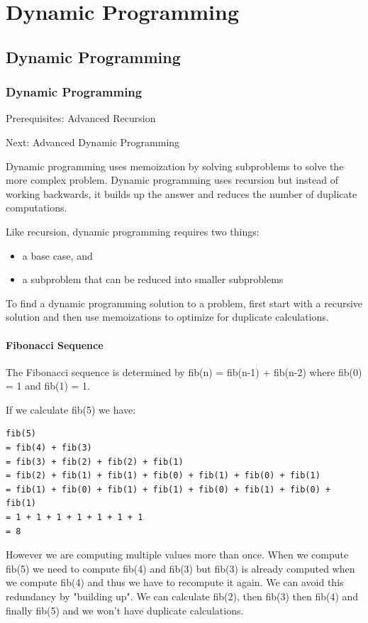 \documentclass[11pt,oneside]{book}
\begin{document}
\part{ Dynamic Programming }
    \chapter{ Dynamic Programming }
        \section{ Dynamic Programming }
        

Prerequisites: Advanced Recursion

Next: Advanced Dynamic Programming

Dynamic programming uses memoization by solving subproblems to solve the more complex problem. Dynamic programming uses recursion but instead of working backwards, it builds up the answer and reduces the number of duplicate computations.

Like recursion, dynamic programming requires two things:

\begin{itemize}
\item a base case, and
\item a subproblem that can be reduced into smaller subproblems 
\end{itemize}

To find a dynamic programming solution to a problem, first start with a recursive solution and then use memoizations to optimize for duplicate calculations.

\subsection{Fibonacci Sequence}

The Fibonacci sequence is determined by fib(n) = fib(n-1) + fib(n-2) where fib(0) = 1 and fib(1) = 1.

If we calculate fib(5) we have:

\begin{lstlisting}
fib(5) 
= fib(4) + fib(3) 
= fib(3) + fib(2) + fib(2) + fib(1) 
= fib(2) + fib(1) + fib(1) + fib(0) + fib(1) + fib(0) + fib(1) 
= fib(1) + fib(0) + fib(1) + fib(1) + fib(0) + fib(1) + fib(0) + fib(1) 
= 1 + 1 + 1 + 1 + 1 + 1 + 1
= 8
\end{lstlisting}

However we are computing multiple values more than once. When we compute fib(5) we need to compute fib(4) and fib(3) but fib(3) is already computed when we compute fib(4) and thus we have to recompute it again. We can avoid this redundancy by "building up". We can calculate fib(2), then fib(3) then fib(4) and finally fib(5) and we won't have duplicate calculations.
\end{document}
